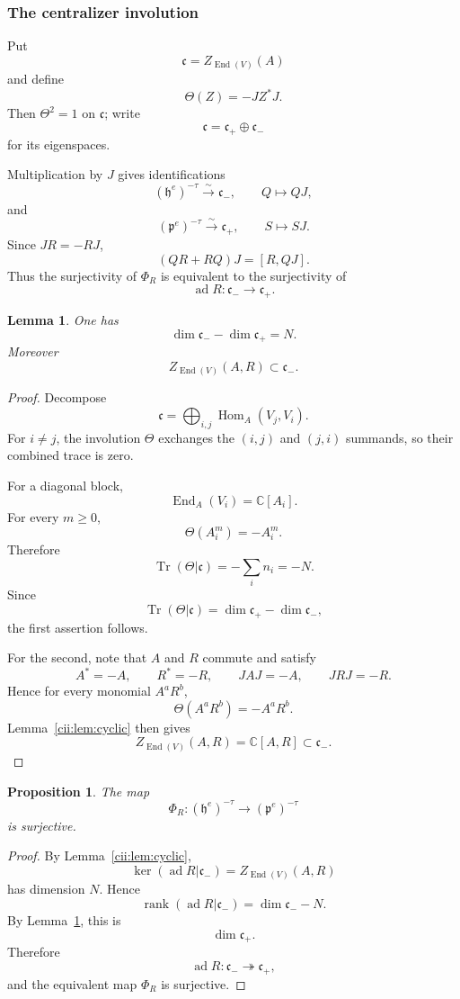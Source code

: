 \documentclass[10pt,a4paper]{amsart}
\numberwithin{equation}{section}
\newtheorem{proposition}[theorem]{Proposition}
\newtheorem{lemma}[theorem]{Lemma}
\newcommand{\C}{\mathbb C}
\newcommand{\Hom}{\operatorname{Hom}}
\newcommand{\End}{\operatorname{End}}
\newcommand{\ad}{\operatorname{ad}}
\newcommand{\Tr}{\operatorname{Tr}}
\begin{document}
\subsubsection{The centralizer involution}

Put
\[
\mathfrak c=Z_{\End(V)}(A)
\]
and define
\[
\Theta(Z)=-JZ^*J.
\]
Then \(\Theta^2=1\) on \(\mathfrak c\); write
\[
\mathfrak c=\mathfrak c_+\oplus\mathfrak c_-
\]
for its eigenspaces.

Multiplication by \(J\) gives identifications
\[
(\mathfrak h^e)^{-\tau}\xrightarrow{\sim}\mathfrak c_-,
\qquad
Q\longmapsto QJ,
\]
and
\[
(\mathfrak p^e)^{-\tau}\xrightarrow{\sim}\mathfrak c_+,
\qquad
S\longmapsto SJ.
\]
Since \(JR=-RJ\),
\[
(QR+RQ)J=[R,QJ].
\]
Thus the surjectivity of \(\Phi_R\) is equivalent to the surjectivity of
\[
\ad R:\mathfrak c_-\longrightarrow\mathfrak c_+.
\]

\begin{lemma}\label{cii:lem:dimension-difference}
One has
\[
\dim\mathfrak c_- -\dim\mathfrak c_+=N.
\]
Moreover
\[
Z_{\End(V)}(A,R)\subset\mathfrak c_-.
\]
\end{lemma}

\begin{proof}
Decompose
\[
\mathfrak c
=
\bigoplus_{i,j}\Hom_A(V_j,V_i).
\]
For \(i\neq j\), the involution \(\Theta\) exchanges the \((i,j)\) and
\((j,i)\) summands, so their combined trace is zero.

For a diagonal block,
\[
\End_A(V_i)=\C[A_i].
\]
For every \(m\geq0\),
\[
\Theta(A_i^m)=-A_i^m.
\]
Therefore
\[
\Tr(\Theta|\mathfrak c)
=
-\sum_i n_i=-N.
\]
Since
\[
\Tr(\Theta|\mathfrak c)
=
\dim\mathfrak c_+ -\dim\mathfrak c_-,
\]
the first assertion follows.

For the second, note that \(A\) and \(R\) commute and satisfy
\[
A^*=-A,\qquad R^*=-R,\qquad
JAJ=-A,\qquad JRJ=-R.
\]
Hence for every monomial \(A^aR^b\),
\[
\Theta(A^aR^b)=-A^aR^b.
\]
Lemma~\ref{cii:lem:cyclic} then gives
\[
Z_{\End(V)}(A,R)=\C[A,R]\subset\mathfrak c_-.
\]
\end{proof}

\begin{proposition}\label{cii:prop:surjectivity}
The map
\[
\Phi_R:
(\mathfrak h^e)^{-\tau}
\longrightarrow
(\mathfrak p^e)^{-\tau}
\]
is surjective.
\end{proposition}

\begin{proof}
By Lemma~\ref{cii:lem:cyclic},
\[
\ker(\ad R|\mathfrak c_-)
=
Z_{\End(V)}(A,R)
\]
has dimension \(N\).  Hence
\[
\operatorname{rank}(\ad R|\mathfrak c_-)
=
\dim\mathfrak c_- -N.
\]
By Lemma~\ref{cii:lem:dimension-difference}, this is
\[
\dim\mathfrak c_+.
\]
Therefore
\[
\ad R:\mathfrak c_-\twoheadrightarrow\mathfrak c_+,
\]
and the equivalent map \(\Phi_R\) is surjective.
\end{proof}
\end{document}
